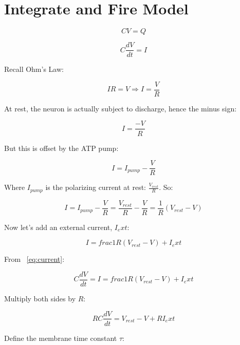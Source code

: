 \documentclass[../doc.tex]{subfiles}
\begin{document}
\section{Integrate and Fire Model}

\begin{equation}
CV = Q 
\end{equation}

\begin{equation}\label{eq:current}
C \frac{dV}{dt} = I 
\end{equation}

Recall Ohm's Law:

\begin{equation}
IR = V \Rightarrow I = \frac{V}{R} 
\end{equation}

At rest, the neuron is actually subject to discharge, hence the minus sign:

\begin{equation}
I = \frac{-V}{R} 
\end{equation}

But this is offset by the ATP pump:

\begin{equation}
I = I_{pump} - \frac{V}{R} 
\end{equation}

Where $I_{pump}$ is the polarizing current at rest: $\frac{V_{rest}}{R}$. So:

\begin{equation}
I = I_{pump} - \frac{V}{R} = \frac{V_{rest}}{R} - \frac{V}{R} = \frac{1}{R} (V_{rest} - V)
\end{equation} 

Now let's add an external current, $I_ext$:

\begin{equation}
I = frac{1}{R} (V_{rest} - V) + I_ext
\end{equation} 

From ~\ref{eq:current}:

\begin{equation}
C \frac{dV}{dt} = I = frac{1}{R} (V_{rest} - V) + I_ext
\end{equation} 

Multiply both sides by $R$:

\begin{equation}\label{eq:RC}
RC \frac{dV}{dt} = V_{rest} - V + RI_ext
\end{equation} 

Define the membrane time constant $\tau$:
\end{document}
